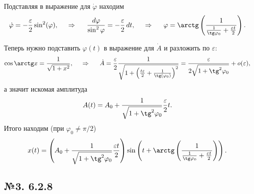 Подставляя в выражение для $\dot{\varphi}$ находим
\begin{equation*}
    \dot{\varphi} = - \frac{\varepsilon}{2} \sin^2(\varphi),
    \hspace{0.5cm} \Rightarrow \hspace{0.5cm}
    \frac{d \varphi}{\sin^2 \varphi} = - \frac{\varepsilon}{2} \d t,
    \hspace{0.5cm} \Rightarrow \hspace{0.5cm}
    \varphi = \arctg\left(
        \frac{1}{\frac{1}{\tg \varphi_0} + \frac{\varepsilon t}{2}}
    \right).
\end{equation*}



Теперь нужно подставить $\varphi(t)$ в выражение для $\dot{A}$ и разложить по $\varepsilon$:
\begin{equation*}
    \cos \arctg x = \frac{1}{\sqrt{1+x^2}},
    \hspace{0.5cm} \Rightarrow \hspace{0.5cm}
    \dot{A} = \frac{\varepsilon}{2} \frac{1}{\sqrt{1 + \left(\frac{t \varepsilon }{2}+\frac{1}{\tg (\varphi_0)}\right)^2}} = \frac{\varepsilon}{2 \sqrt{1 + \tg^2 \varphi_0}} + o(\varepsilon),
\end{equation*}
а значит искомая амплитуда
\begin{equation*}
    A(t) = A_0 + \frac{1}{\sqrt{1 + \tg^2 \varphi_0}} \frac{\varepsilon}{2} t.
\end{equation*}
Итого находим (при $\varphi_0 \neq \pi/2$)
\begin{equation*}
    x(t) = \left(A_0 + \frac{1}{\sqrt{1 + \tg^2 \varphi_0}} \frac{\varepsilon t}{2}\right) \sin\left(
        t + \arctg\left(
        \frac{1}{\frac{1}{\tg \varphi_0} + \frac{\varepsilon t}{2}}
    \right)
    \right).
\end{equation*}




\subsection*{№3. 6.2.8}


